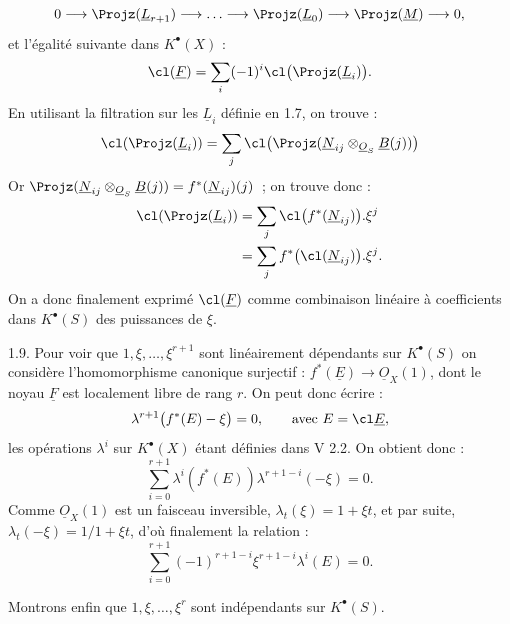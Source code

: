 
\[
  0\longrightarrow \Projz(\underline{L}_{r+1})\longrightarrow\ldots\longrightarrow
  \Projz(\underline{L}_0)\longrightarrow\Projz(\underline{M})\longrightarrow 0,
\]
et l'égalité suivante dans \(K^{\bullet}(X)\) :
\[
  \cl(\underline{F})=\sum_i(-1)^i\cl\bigl(\Projz(\underline{L}_i)\bigr).
\]
En utilisant la filtration sur les \(\underline{L}_i\) définie en 1.7, on trouve :
\[
  \cl(\Projz(\underline{L}_i))=\sum_j \cl\bigl(\Projz(\underline{N}_{ij}\otimes_{\underline{O}_S}\underline{B}(j))\bigr)
\]
Or \(\Projz(\underline{N}_{ij}\otimes_{\underline{O}_S}\underline{B}(j))=f^*(\underline{N}_{ij})(j)\)~; on trouve donc :
\[
\begin{aligned}
  \cl(\Projz(\underline{L}_i))
  &=\sum_j \cl\bigl(f^*(\underline{N}_{ij})\bigr).\xi^j \\
  &=\sum_j f^*\bigl(\cl(\underline{N}_{ij})\bigr).\xi^j.
\end{aligned}
\]
On a donc finalement exprimé \(\cl(\underline{F})\) comme combinaison linéaire à coefficients dans \(K^{\bullet}(S)\) des puissances de \(\xi\).

1.9. Pour voir que \(1,\xi,\ldots,\xi^{r+1}\) sont linéairement dépendants sur \(K^{\bullet}(S)\) on considère l'homomorphisme canonique surjectif : \(f^*(\underline{E})\to\underline{O}_X(1)\), dont le noyau \(\underline{F}\) est localement libre de rang \(r\). On peut donc écrire :
\[
  \lambda^{r+1}\bigl(f^*(E)-\xi\bigr)=0,
  \qquad \text{avec } E=\cl\underline{E},
\]
les opérations \(\lambda^i\) sur \(K^{\bullet}(X)\) étant définies dans V 2.2. On obtient donc :
\[
  \sum_{i=0}^{r+1}\lambda^i(f^*(E))\lambda^{r+1-i}(-\xi)=0.
\]
Comme \(\underline{O}_X(1)\) est un faisceau inversible, \(\lambda_t(\xi)=1+\xi t\), et par suite, \(\lambda_t(-\xi)=1/1+\xi t\), d'où finalement la relation :
\begin{equation}\tag{1.9.1}
  \sum_{i=0}^{r+1}(-1)^{r+1-i}\xi^{r+1-i}\lambda^i(E)=0.
\end{equation}

Montrons enfin que \(1,\xi,\ldots,\xi^r\) sont indépendants sur \(K^{\bullet}(S)\).



